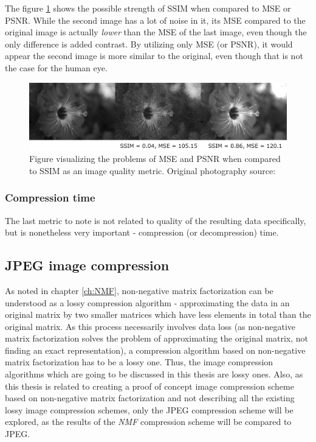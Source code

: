 \documentclass[thesis=M,english]{FITthesis}[2012/10/20]
\begin{document}
The figure \ref{fig:ssimmse} shows the possible strength of SSIM when compared to
MSE or PSNR. While the second image has a lot of noise in it, its MSE compared to
the original image is actually \emph{lower} than the MSE of the last image, even
though the only difference is added contrast. By utilizing only MSE (or PSNR), it
would appear the second image is more similar to the original, even though that
is not the case for the human eye.

\begin{figure}[h]
  \centering
  \includegraphics[scale=0.62]{imgs/flower_mse_psnr_ssim}
  \caption{Figure visualizing the problems of MSE and PSNR when compared to
           SSIM as an image quality metric. Original photography source: \cite{imgcomprbenchmark}}
  \label{fig:ssimmse}
\end{figure}

\subsubsection{Compression time}
The last metric to note is not related to quality of the resulting data specifically,
but is nonetheless very important - compression (or decompression) time.

\subsection{JPEG image compression}
As noted in chapter \ref{ch:NMF}, non-negative matrix factorization can
be understood as a lossy compression algorithm - approximating the
data in an original matrix by two smaller matrices which have less
elements in total than the original matrix. As this process necessarily
involves data loss (as non-negative matrix factorization solves the problem
of approximating the original matrix, not finding an exact representation),
a compression algorithm based on non-negative matrix factorization has to be
a lossy one. Thus, the image compression algorithms which are going to be
discussed in this thesis are lossy ones. Also, as this thesis is related
to creating a proof of concept image compression scheme based on non-negative
matrix factorization and not describing all the existing lossy image
compression schemes, only the JPEG compression scheme will be explored,
as the results of the \emph{NMF} compression scheme will be compared to
JPEG.
\\
\end{document}
